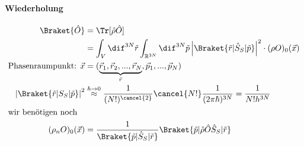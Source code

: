 \paragraph{Wiederholung}
\begin{align}
    \Braket{\hat{O}} &= \Tr[\hat \rho \hat O]\\
    &=\int_V \dif^{3N}\tilde r \int_{\mathbb{R}^{3N}}\dif^{3N}\tilde p 
    \left|\Braket{\tilde r|\hat S_S|\tilde p}\right|^2\cdot(\rho O)_0(\vec{x})\\
    \text{Phasenraumpunkt: } \vec x &=(\underbrace{\vec r_1, \vec r_2, ...,\vec r_N}_{\tilde r}, \vec p_1,..., \vec p_N)\\
    \left|\Braket{\tilde r|S_S|\tilde p}\right|^2 &\stackrel{\hbar \to 0}{\approx}\frac{1}{(N!)^{\cancel{2}}}\cancel{N!} \frac{1}{(2\pi\hbar)^{3N}}=\frac{1}{N!h^{3N}}\\
\intertext{wir benötigen noch}
    (\rho_n O)_0(\vec x) &= \frac1{\Braket{\tilde p | \hat S_S | \tilde r}} \Braket{\tilde p | \hat \rho \hat O \hat S_S | \tilde r}
\end{align}
